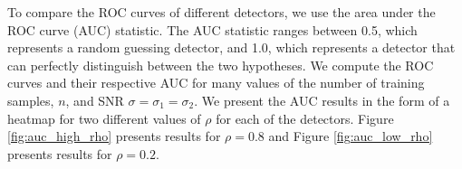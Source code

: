 To compare the ROC curves of different detectors, we use the area under the ROC curve
(AUC) statistic. The AUC statistic ranges between 0.5, which represents a random guessing
detector, and 1.0, which represents a detector that can perfectly distinguish between the
two hypotheses. We compute the ROC curves and their respective AUC for many values of the
number of training samples, $n$, and SNR $\sigma=\sigma_1=\sigma_2$. We present the AUC
results in the form of a heatmap for two different values of $\rho$ for each of the
detectors. Figure \ref{fig:auc_high_rho} presents results for $\rho=0.8$ and Figure
\ref{fig:auc_low_rho} presents results for $\rho = 0.2$.

\begin{figure} 
\end{figure}
